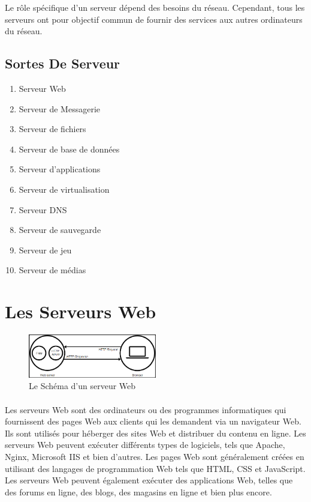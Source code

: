  Le rôle spécifique d'un serveur dépend des besoins du réseau. Cependant, tous les serveurs ont pour objectif commun de fournir des services aux autres ordinateurs du réseau.
 
 \subsection*{ Sortes De Serveur}
\begin{enumerate}
     \item Serveur Web
     \item Serveur de Messagerie
     \item Serveur de fichiers
     \item Serveur de base de données 
     \item Serveur d'applications
     \item Serveur de virtualisation
     \item Serveur DNS
     \item Serveur de sauvegarde 
     \item Serveur de jeu 
     \item Serveur de médias    
\end{enumerate}
 
  
\section{Les Serveurs Web}
 
\begin{figure}[h]
	\begin{center}
		
	\includegraphics[width=0.5\textwidth]{PhotoMemoire/Server_web.png}
\caption{Le Schéma d'un serveur Web}
	\end{center}
\end{figure}
\paragraph{ }
Les serveurs Web sont des ordinateurs ou des programmes informatiques qui fournissent des pages Web aux clients qui les demandent via un navigateur Web. Ils sont utilisés pour héberger des sites Web et distribuer du contenu en ligne. Les serveurs Web peuvent exécuter différents types de logiciels, tels que Apache, Nginx, Microsoft IIS et bien d'autres. Les pages Web sont généralement créées en utilisant des langages de programmation Web tels que HTML, CSS et JavaScript. Les serveurs Web peuvent également exécuter des applications Web, telles que des forums en ligne, des blogs, des magasins en ligne et bien plus encore.

